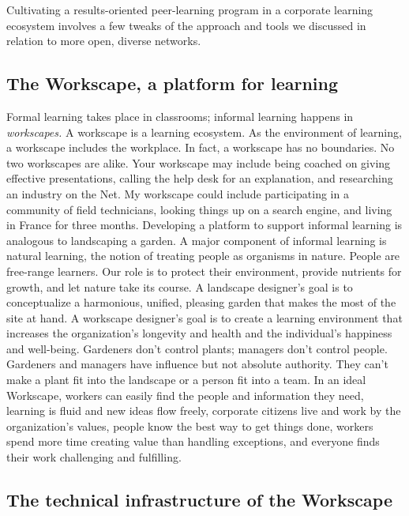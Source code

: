 Cultivating a results-oriented peer-learning program in a corporate
learning ecosystem involves a few tweaks of the approach and tools we
discussed in relation to more open, diverse networks.

\hypertarget{the-workscape-a-platform-for-learning}{%
\subsection{The Workscape, a platform for
learning}\label{the-workscape-a-platform-for-learning}}

Formal learning takes place in classrooms; informal learning happens in
\emph{workscapes.} A workscape is a learning ecosystem. As the
environment of learning, a workscape includes the workplace. In fact, a
workscape has no boundaries. No two workscapes are alike. Your workscape
may include being coached on giving effective presentations, calling the
help desk for an explanation, and researching an industry on the Net. My
workscape could include participating in a community of field
technicians, looking things up on a search engine, and living in France
for three months. Developing a platform to support informal learning is
analogous to landscaping a garden. A major component of informal
learning is natural learning, the notion of treating people as organisms
in nature. People are free-range learners. Our role is to protect their
environment, provide nutrients for growth, and let nature take its
course. A landscape designer's goal is to conceptualize a harmonious,
unified, pleasing garden that makes the most of the site at hand. A
workscape designer's goal is to create a learning environment that
increases the organization's longevity and health and the individual's
happiness and well-being. Gardeners don't control plants; managers don't
control people. Gardeners and managers have influence but not absolute
authority. They can't make a plant fit into the landscape or a person
fit into a team. In an ideal Workscape, workers can easily find the
people and information they need, learning is fluid and new ideas flow
freely, corporate citizens live and work by the organization's values,
people know the best way to get things done, workers spend more time
creating value than handling exceptions, and everyone finds their work
challenging and fulfilling.

\hypertarget{the-technical-infrastructure-of-the-workscape}{%
\subsection{The technical infrastructure of the
Workscape}\label{the-technical-infrastructure-of-the-workscape}}

